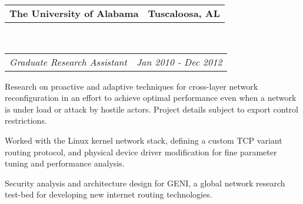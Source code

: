 \documentclass[10pt,letterpaper]{article}
\makeatletter
\newcommand{\headerrow}[2]
{\begin{tabular*}{\linewidth}{l@{\extracolsep{\fill}}r}
	#1 &
	#2 \\
\end{tabular*}}
\newcommand{\employment}[5]{
	\headerrow
		{\textbf{#1}}
		{\textbf{#2}}
	\\
	\headerrow
		{\emph{#3}}
		{\emph{#4}}
	\begin{itemize*}
		\item #5
	\end{itemize*}
}
\makeatother
\begin{document}
\employment{The University of Alabama}{Tuscaloosa, AL}{Graduate Research Assistant}{Jan 2010 - Dec 2012}{
Research on proactive and adaptive techniques for cross-layer network
reconfiguration in an effort to achieve optimal performance even when a network
is under load or attack by hostile actors. Project details subject to export control restrictions.
\item Worked with the Linux kernel network stack, defining a custom TCP variant
  routing protocol, and physical device driver modification for fine parameter tuning and performance analysis.
\item Security analysis and architecture design for GENI, a global network
  research test-bed for developing new internet routing technologies.
}

\end{document}
